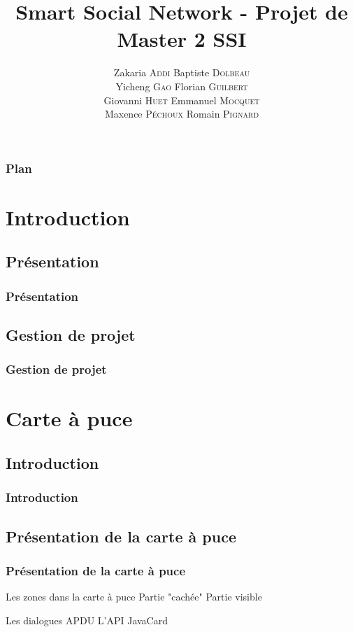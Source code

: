 \documentclass{beamer}
\title{Smart Social Network - Projet de Master 2 SSI}
\author{
    Zakaria \textsc{Addi}
    Baptiste \textsc{Dolbeau}\\
    Yicheng \textsc{Gao}
    Florian \textsc{Guilbert}\\
    Giovanni \textsc{Huet}
    Emmanuel \textsc{Mocquet}\\
    Maxence \textsc{Péchoux}
    Romain \textsc{Pignard}
}
\institute{Université de Rouen}
\begin{document}
\begin{frame}
\titlepage 
\end{frame}

\begin{frame}
\frametitle{Plan}
\tableofcontents[hideallsubsections]
\end{frame}

\section{Introduction}

\subsection{Présentation}
\begin{frame}
    \frametitle{Présentation}
    \begin{block}{ }
    \end{block}
\end{frame}

\subsection{Gestion de projet}
\begin{frame}
    \frametitle{Gestion de projet}
    \begin{block}{ }
    \end{block}
\end{frame}

\section{Carte à puce}

\subsection{Introduction}
\begin{frame}
    \frametitle{Introduction}
    \begin{block}{}
    \end{block}
\end{frame}

\subsection{Présentation de la carte à puce}
\begin{frame}
    \frametitle{Présentation de la carte à puce}
    \begin{block}{Les zones dans la carte à puce}
        Partie "cachée" 
        Partie visible
    \end{block}

    \pause

    \begin{block}{Les dialogues}
        APDU
        L'API JavaCard
        
    \end{block}
\end{frame}
\end{document}
